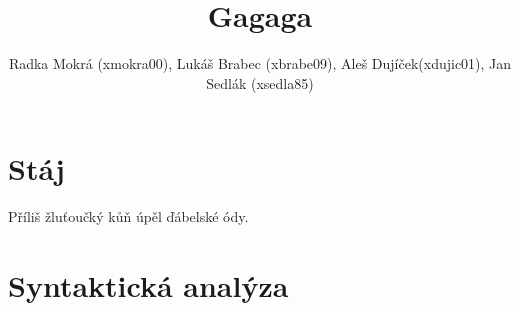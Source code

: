 \documentclass[a4paper,11pt,titlepage]{article}
\author{Radka Mokrá (xmokra00), Lukáš Brabec (xbrabe09), Aleš Dujíček(xdujic01), Jan Sedlák (xsedla85)}
\title{Gagaga}
\begin{document}
\maketitle
\tableofcontents

\section{Stáj}
Příliš žluťoučký kůň úpěl ďábelské ódy.

\section{Syntaktická analýza}

\end{document}
